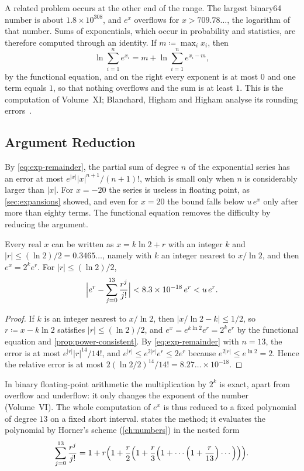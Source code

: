 A related problem occurs at the other end of the range. The largest binary64 number is about $1.8\times10^{308}$, and $e^x$ overflows for $x>709.78\ldots$, the logarithm of that number. Sums of exponentials, which occur in probability and statistics, are therefore computed through an identity. If $m\coloneqq\max_ix_i$, then
\[
\ln\sum_{i=1}^ne^{x_i}=m+\ln\sum_{i=1}^ne^{x_i-m},
\]
by the functional equation, and on the right every exponent is at most $0$ and one term equals $1$, so that nothing overflows and the sum is at least $1$. This is the  computation of Volume~XI; Blanchard, Higham and Higham analyse its rounding errors~\cite{blanchard2021logsumexp}.

\subsection{Argument Reduction}

By \eqref{eq:exp-remainder}, the partial sum of degree $n$ of the exponential series has an error at most $e^{|x|}|x|^{n+1}/(n+1)!$, which is small only when $n$ is considerably larger than $|x|$. For $x=-20$ the series is useless in floating point, as \cref{sec:expansions} showed, and even for $x=20$ the bound falls below $u\,e^x$ only after more than eighty terms. The functional equation removes the difficulty by reducing the argument.

\begin{proposition}
\label{prop:exp-reduction}
Every real $x$ can be written as $x=k\ln2+r$ with an integer $k$ and $|r|\le(\ln2)/2=0.3465\ldots$, namely with $k$ an integer nearest to $x/\ln2$, and then $e^x=2^ke^r$. For $|r|\le(\ln2)/2$,
\[
\Bigl|e^r-\sum_{j=0}^{13}\frac{r^j}{j!}\Bigr|<8.3\times10^{-18}\,e^r<u\,e^r .
\]
\end{proposition}

\begin{proof}
If $k$ is an integer nearest to $x/\ln2$, then $|x/\ln2-k|\le1/2$, so $r\coloneqq x-k\ln2$ satisfies $|r|\le(\ln2)/2$, and $e^x=e^{k\ln2}e^r=2^ke^r$ by the functional equation and \cref{prop:power-consistent}. By \eqref{eq:exp-remainder} with $n=13$, the error is at most $e^{|r|}|r|^{14}/14!$, and $e^{|r|}\le e^{2|r|}e^r\le2e^r$ because $e^{2|r|}\le e^{\ln2}=2$. Hence the relative error is at most $2(\ln2/2)^{14}/14!=8.27\ldots\times10^{-18}$.
\end{proof}

In binary floating-point arithmetic the multiplication by $2^k$ is exact, apart from overflow and underflow: it only changes the exponent of the number (Volume~VI). The whole computation of $e^x$ is thus reduced to a fixed polynomial of degree $13$ on a fixed short interval.  states the method; it evaluates the polynomial by Horner's scheme (\cref{ch:numbers}) in the nested form
\[
\sum_{j=0}^{13}\frac{r^j}{j!}=1+r\Bigl(1+\frac r2\Bigl(1+\frac r3\Bigl(1+\cdots\Bigl(1+\frac r{13}\Bigr)\cdots\Bigr)\Bigr)\Bigr).
\]

